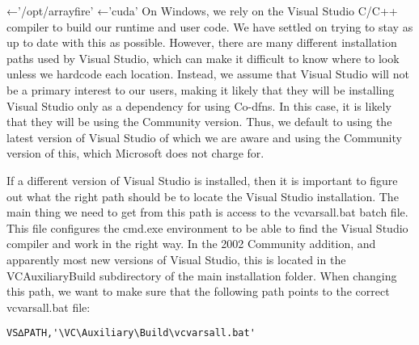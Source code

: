\documentclass{article}%
\begin{document}
\nwenddocs{}\plusendmoddef\nwstartdeflinemarkup{}\nwenddeflinemarkup
{}←'/opt/arrayfire'
←'cuda'
\eatline
{}\nwendcode{}\nwdocspar
\noindent
On Windows, we rely on the Visual Studio C/C++ compiler to build
our runtime and user code.
We have settled on trying to stay as up to date with this as 
possible. 
However, there are many different installation paths used by 
Visual Studio, which can make it difficult to know where to look
unless we hardcode each location.
Instead, we assume that Visual Studio will not be a primary 
interest to our users,
making it likely that they will be installing Visual Studio 
only as a dependency for using Co-dfns.
In this case, it is likely that they will be using the Community 
version.
Thus, we default to using the latest version of Visual Studio 
of which we are aware and using the Community version of this,
which Microsoft does not charge for.

If a different version of Visual Studio is installed, then it is 
important to figure out what the right path should be to locate 
the Visual Studio installation. 
The main thing we need to get from this path is access 
to the {\Tt{}vcvarsall.bat\nwendquote} batch file.
This file configures the {\Tt{}cmd.exe\nwendquote} environment to be able to 
find the Visual Studio compiler and work in the right way.
In the 2002 Community addition, and apparently most new versions 
of Visual Studio, this is located in the {\Tt{}VC{\nwbackslash}Auxiliary{\nwbackslash}Build{\nwbackslash}\nwendquote}
subdirectory of the main installation folder.
When changing this path, we want to make sure that the following
path points to the correct {\Tt{}vcvarsall.bat\nwendquote} file:

\begin{verbatim}
VS∆PATH,'\VC\Auxiliary\Build\vcvarsall.bat'
\end{verbatim}
\end{document}

